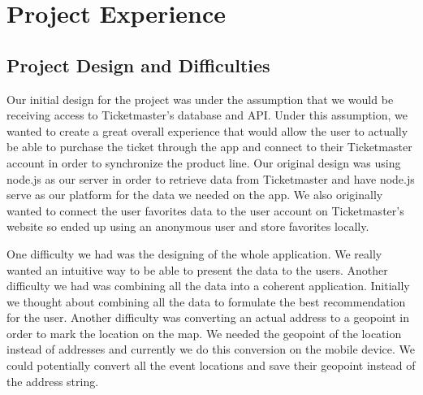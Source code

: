 \section{Project Experience}
	\subsection{Project Design and Difficulties}
         Our initial design for the project was under the assumption that we would be receiving access to Ticketmaster’s database and API. Under 
         this assumption, we wanted to create a great overall experience that would allow the user to actually be able to purchase the ticket 
         through the app and connect to their Ticketmaster account in order to synchronize the product line. Our original design was using 
         node.js as our server in order to retrieve data from Ticketmaster and have node.js serve as our platform for the data we needed on the 
         app. We also originally wanted to connect the user favorites data to the user account on Ticketmaster’s website so ended up using an 
         anonymous user and store favorites locally. 
         
         One difficulty we had was the designing of the whole application. We really wanted an intuitive way to be able to present the data to the 
         users. Another difficulty we had was combining all the data into a coherent application. Initially we thought about combining all the data 
         to formulate the best recommendation for the user. Another difficulty was converting an actual address to a geopoint in order to mark 
         the location on the map. We needed the geopoint of the location instead of addresses and currently we do this conversion on the mobile 
         device. We could potentially convert all the event locations and save their geopoint instead of the address string.